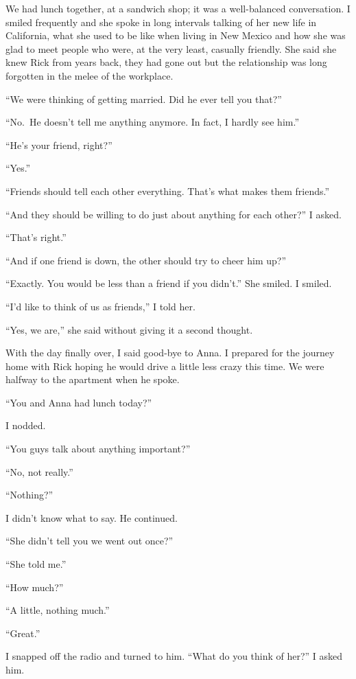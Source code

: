 We had lunch together, at a sandwich shop; it was a well-balanced
conversation. I smiled frequently and she spoke in long intervals
talking of her new life in California, what she used to be like when
living in New Mexico and how she was glad to meet people who were, at
the very least, casually friendly. She said she knew Rick from years
back, they had gone out but the relationship was long forgotten in the
melee of the workplace.

``We were thinking of getting married. Did he ever tell you that?''

``No.~He doesn't tell me anything anymore. In fact, I hardly see him.''

``He's your friend, right?''

``Yes.''

``Friends should tell each other everything. That's what makes them
friends.''

``And they should be willing to do just about anything for each other?''
I asked.

``That's right.''

``And if one friend is down, the other should try to cheer him up?''

``Exactly. You would be less than a friend if you didn't.'' She smiled.
I smiled.

``I'd like to think of us as friends,'' I told her.

``Yes, we are,'' she said without giving it a second thought.

With the day finally over, I said good-bye to Anna. I prepared for the
journey home with Rick hoping he would drive a little less crazy this
time. We were halfway to the apartment when he spoke.

``You and Anna had lunch today?''

I nodded.

``You guys talk about anything important?''

``No, not really.''

``Nothing?''

I didn't know what to say. He continued.

``She didn't tell you we went out once?''

``She told me.''

``How much?''

``A little, nothing much.''

``Great.''

I snapped off the radio and turned to him. ``What do you think of her?''
I asked him.

